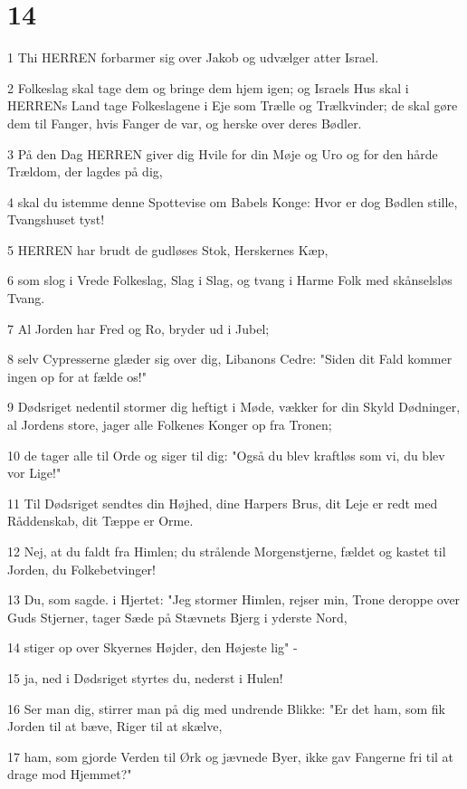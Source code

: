 \chapter{14}

\par 1 Thi HERREN forbarmer sig over Jakob og udvælger atter Israel.
\par 2 Folkeslag skal tage dem og bringe dem hjem igen; og Israels Hus skal i HERRENs Land tage Folkeslagene i Eje som Trælle og Trælkvinder; de skal gøre dem til Fanger, hvis Fanger de var, og herske over deres Bødler.
\par 3 På den Dag HERREN giver dig Hvile for din Møje og Uro og for den hårde Trældom, der lagdes på dig,
\par 4 skal du istemme denne Spottevise om Babels Konge: Hvor er dog Bødlen stille, Tvangshuset tyst!
\par 5 HERREN har brudt de gudløses Stok, Herskernes Kæp,
\par 6 som slog i Vrede Folkeslag, Slag i Slag, og tvang i Harme Folk med skånselsløs Tvang.
\par 7 Al Jorden har Fred og Ro, bryder ud i Jubel;
\par 8 selv Cypresserne glæder sig over dig, Libanons Cedre: "Siden dit Fald kommer ingen op for at fælde os!"
\par 9 Dødsriget nedentil stormer dig heftigt i Møde, vækker for din Skyld Dødninger, al Jordens store, jager alle Folkenes Konger op fra Tronen;
\par 10 de tager alle til Orde og siger til dig: "Også du blev kraftløs som vi, du blev vor Lige!"
\par 11 Til Dødsriget sendtes din Højhed, dine Harpers Brus, dit Leje er redt med Råddenskab, dit Tæppe er Orme.
\par 12 Nej, at du faldt fra Himlen; du strålende Morgenstjerne, fældet og kastet til Jorden, du Folkebetvinger!
\par 13 Du, som sagde. i Hjertet: "Jeg stormer Himlen, rejser min, Trone deroppe over Guds Stjerner, tager Sæde på Stævnets Bjerg i yderste Nord,
\par 14 stiger op over Skyernes Højder, den Højeste lig" -
\par 15 ja, ned i Dødsriget styrtes du, nederst i Hulen!
\par 16 Ser man dig, stirrer man på dig med undrende Blikke: "Er det ham, som fik Jorden til at bæve, Riger til at skælve,
\par 17 ham, som gjorde Verden til Ørk og jævnede Byer, ikke gav Fangerne fri til at drage mod Hjemmet?"
